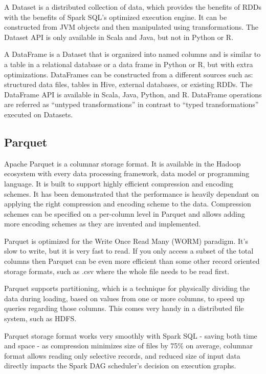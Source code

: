 A Dataset is a distributed collection of data, which provides the benefits of RDDs with the benefits of Spark SQL’s optimized execution engine. It can be constructed from JVM objects and then manipulated using transformations. The Dataset API is only available in Scala and Java, but not in Python or R. 

A DataFrame is a Dataset that is organized into named columns and is similar to a table in a relational database or a data frame in Python or R, but with extra optimizations. DataFrames can be constructed from a different sources such as: structured data files, tables in Hive, external databases, or existing RDDs. The DataFrame API is available in Scala, Java, Python, and R. DataFrame operations are referred as “untyped transformations” in contrast to “typed transformations”  executed on Datasets.\cite{spark-sql}

\subsection{Parquet}
Apache Parquet is a columnar storage format. It is available in the Hadoop ecosystem with every data processing framework, data model or programming language. It is built to support highly efficient compression and encoding schemes. It has been demonstrated that the performance is heavily dependant on applying the right compression and encoding scheme to the data. Compression schemes can be specified on a per-column level in Parquet and allows adding more encoding schemes as they are invented and implemented.
\cite{parquet}

Parquet is optimized for the Write Once Read Many (WORM) paradigm. It’s slow to write, but it is very fast to read. If you only access a subset of the total columns then Parquet can be even more efficient than some other record oriented storage formats, such as .csv where the whole file needs to be read first. 

Parquet supports partitioning, which is a technique for physically dividing the data during loading, based on values from one or more columns, to speed up queries regarding those columns. This comes very handy in a distributed file system, such as HDFS.

Parquet storage format works very smoothly with Spark SQL - saving both time and space - as compression minimizes size of files by 75\% on average, columnar format allows reading only selective records, and reduced size of input data directly impacts the Spark DAG scheduler’s decision on execution graphs. \cite{ibm_parquet}


